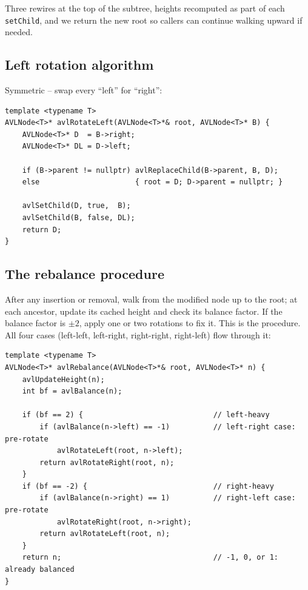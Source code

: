 \documentclass[11pt]{article}
\begin{document}
Three rewires at the top of the subtree, heights recomputed as part of each \texttt{setChild}, and we return the new root so callers can continue walking upward if needed.

\subsection*{Left rotation algorithm}

Symmetric -- swap every ``left'' for ``right'':

\begin{lstlisting}
template <typename T>
AVLNode<T>* avlRotateLeft(AVLNode<T>*& root, AVLNode<T>* B) {
    AVLNode<T>* D  = B->right;
    AVLNode<T>* DL = D->left;

    if (B->parent != nullptr) avlReplaceChild(B->parent, B, D);
    else                      { root = D; D->parent = nullptr; }

    avlSetChild(D, true,  B);
    avlSetChild(B, false, DL);
    return D;
}
\end{lstlisting}

\subsection*{The rebalance procedure}

After any insertion or removal, walk from the modified node up to the root; at each ancestor, update its cached height and check its balance factor. If the balance factor is $\pm 2$, apply one or two rotations to fix it. This is the procedure. All four cases (left-left, left-right, right-right, right-left) flow through it:

\begin{lstlisting}
template <typename T>
AVLNode<T>* avlRebalance(AVLNode<T>*& root, AVLNode<T>* n) {
    avlUpdateHeight(n);
    int bf = avlBalance(n);

    if (bf == 2) {                              // left-heavy
        if (avlBalance(n->left) == -1)          // left-right case: pre-rotate
            avlRotateLeft(root, n->left);
        return avlRotateRight(root, n);
    }
    if (bf == -2) {                             // right-heavy
        if (avlBalance(n->right) == 1)          // right-left case: pre-rotate
            avlRotateRight(root, n->right);
        return avlRotateLeft(root, n);
    }
    return n;                                   // -1, 0, or 1: already balanced
}
\end{lstlisting}
\end{document}

